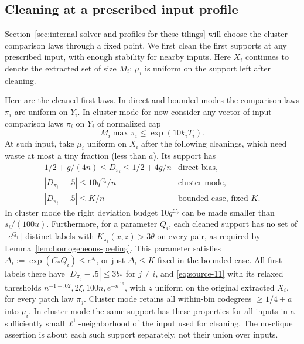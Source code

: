 \subsection{Cleaning at a prescribed input profile}
\label{sec:cleaning-at-input-profile}

Section~\ref{sec:internal-solver-and-profiles-for-these-tilings} will choose
the cluster comparison laws through a fixed point. We first clean the
first supports at any prescribed input, with enough stability for nearby
inputs. Here \(X_i\) continues to denote the extracted set of size \(M_i\);
\(\mu_i\) is uniform on the support left after cleaning.

\begin{lemma}\label{lem:stable-patch-cleaning}
Here are the cleaned first laws. In direct and bounded modes the comparison laws \(\pi_i\) are uniform on \(Y_i\). In cluster mode for now consider any vector of input comparison laws \(\pi_i\) on \(Y_i\) of normalized cap
\[
 M_i\max\pi_i\le \exp(10 k_iT_i).
\]
At such input, take \(\mu_i\) uniform on \(X_i\) after the following cleanings, which need waste at most a tiny fraction (less than \(a\)). Its support has
\begin{equation}
 \begin{array}{ll}
  1/2+g/(4n)\le D_{\pi_i}\le1/2+4g/n &\text{direct bias},\\
  |D_{\pi_i}-.5|\le 10q^{C_b}/n &\text{cluster mode},\\
  |D_{\pi_i}-.5|\le K/n &\text{bounded case, fixed }K.
 \end{array} \label{eq:source-12}
\end{equation}
In cluster mode the right deviation budget \(10q^{C_b}\) can be made smaller than \(s_i/(100u)\). Furthermore, for a parameter \(Q_i\), each cleaned support has no set of \(\lceil e^{Q_i}\rceil\) distinct labels with \(K_{\pi_i}(x,z)>3\theta\) on every pair, as required by Lemma~\ref{lem:homogeneous-peeling}. This parameter satisfies \(\Delta_i:=\exp(C_* Q_i)\le e^{s_i}\), or just \(\Delta_i\le K\) fixed in the bounded case. All first labels there have \(|D_{\pi_j}-.5|\le 3b_*\) for \(j\ne i\), and \eqref{eq:source-11} with its relaxed thresholds \(n^{-1-.02},2\xi,100n,e^{-n^{.19}}\), with \(z\) uniform on the original extracted \(X_i\), for every patch law \(\pi_j\). Cluster mode retains all within-bin codegrees \(\ge1/4+a\) into \(\mu_i\). In cluster mode the same support has these properties for all inputs in a sufficiently small \(\ell^1\)-neighborhood of the input used for cleaning. The no-clique assertion is about each such support separately, not their union over inputs.
\end{lemma}

